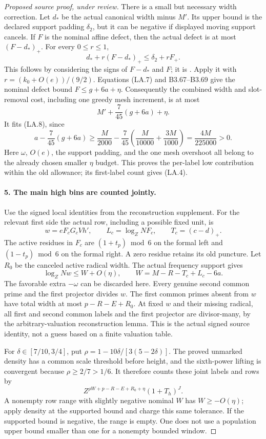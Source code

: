 \begin{proof}[Proposed source proof, under review]
There is a small but necessary width correction. Let $d_*$ be the
actual canonical width minus $M'$. Its upper bound is the declared
support padding $\delta_2$, but it can be negative if displayed
moving support cancels. If $F$ is the nominal affine defect, then
the actual defect is at most $(F-d_*)_+$. For every $0\le r\le1$,
\[
 d_*+r(F-d_*)_+\le\delta_2+rF_+.
 \tag{LA.9}
\]
This follows by considering the signs of $F-d_*$ and $F$; it is
. Apply it with
$r=(k_0+O(e))/(9/2)$. Equations (LA.7) and B3.67--B3.69 give the
nominal defect bound $F\le g+6a+\eta$. Consequently the combined
width and slot-removal cost, including one greedy mesh increment,
is at most
\[
 M'+\frac7{45}(g+6a)+\eta.
\]
It fits (LA.8), since
\[
 a-\frac7{45}(g+6a)
 \ge\frac M{2000}-\frac7{45}
       \left(\frac M{10000}+\frac{3M}{1000}\right)
 =\frac{4M}{225000}>0.
 \tag{LA.10}
\]
Here $\omega$, $O(e)$, the support padding, and the one mesh
overshoot all belong to the already chosen smaller $\eta$ budget.
This proves the per-label low contribution within the old allowance;
its first-label count gives (LA.4).

\paragraph{5. The main high bins are counted jointly.}
Use the signed local identities from the reconstruction supplement.
For the relevant first side the actual row, including a possible
fixed unit, is
\[
 w=eF_cG_cVh',\qquad
 L_c=\log_Z NF_c,\qquad T_c=(c-d)_+.
\]
The active residues in $F_c$ are $(1+t_p)\bmod6$ on the formal
left and $(1-t_p)\bmod6$ on the formal right. A zero residue retains
its old puncture. Let $R_0$ be the canceled active radical width.
The actual frequency support gives
\[
 \log_Z Nw\le W+O(\eta),\qquad
 W=M-R-T_c+L_c-6a.
 \tag{LA.11}
\]
The favorable extra $-\omega$ can be discarded here. Every genuine
second common prime and the first projector divides $w$. The first
common primes absent from $w$ have total width at most
$p-R-E+R_0$. At fixed $w$ and their missing radical, all first and
second common labels and the first projector are divisor-many, by
the arbitrary-valuation reconstruction lemma. This is the actual
signed source identity, not a guess based on a finite valuation table.

For $\delta\in[7/10,3/4]$, put
$\rho=1-10\delta/[3(5-2\delta)]$. The proved unmarked density
has a common scale threshold before height, and the sixth-power
lifting is convergent because $\rho\ge2/7>1/6$. It therefore
counts these joint labels and rows by
\[
 Z^{\rho W+p-R-E+R_0+\eta}(1+T_h)^J.
 \tag{LA.12}
\]
A nonempty row range with slightly negative nominal $W$ has
$W\ge-O(\eta)$; apply density at the supported bound and charge
this same tolerance. If the supported bound is negative, the range
is empty. One does not use a population upper bound smaller than
one for a nonempty bounded window.


\end{proof}
